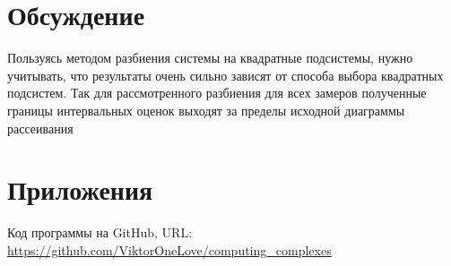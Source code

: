 \documentclass[12pt,a4paper]{article}
\begin{document}
        
    \section{Обсуждение}
        Пользуясь методом разбиения системы на квадратные подсистемы, нужно учитывать, что результаты очень сильно зависят от способа выбора квадратных подсистем. Так для рассмотренного разбиения для всех замеров полученные границы интервальных оценок выходят за пределы исходной диаграммы рассеивания
        
    \section{Приложения}
	    Код программы на GitHub, URL: \url{https://github.com/ViktorOneLove/computing_complexes}
        
\end{document}
